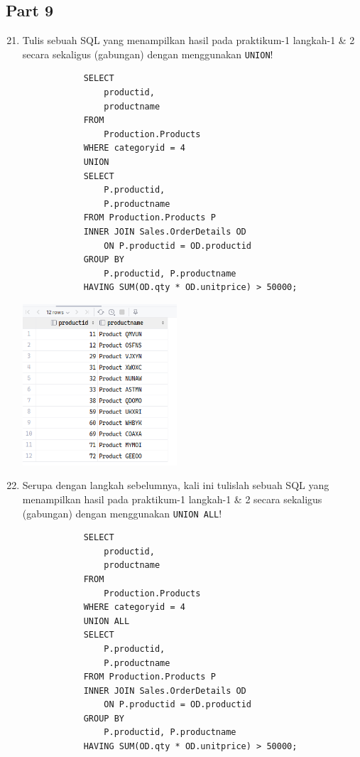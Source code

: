 \documentclass[12pt,titlepage]{article}
\begin{document}
\subsection{Part 9}
\begin{enumerate}
    \setcounter{enumi}{20}
    \item {
        Tulis sebuah SQL yang menampilkan hasil pada praktikum-1 langkah-1 \& 2 secara
        sekaligus (gabungan) dengan menggunakan \texttt{UNION}!

        \begin{verbatim}
            SELECT
                productid,
                productname
            FROM
                Production.Products
            WHERE categoryid = 4
            UNION
            SELECT
                P.productid,
                P.productname
            FROM Production.Products P
            INNER JOIN Sales.OrderDetails OD
                ON P.productid = OD.productid
            GROUP BY
                P.productid, P.productname
            HAVING SUM(OD.qty * OD.unitprice) > 50000;
        \end{verbatim}

        \begin{center}
            \includegraphics[height=6cm]{./images/p9-n1.png}
        \end{center}
    }
    \item {
        Serupa dengan langkah sebelumnya, kali ini tulislah sebuah SQL yang \\ menampilkan
        hasil pada praktikum-1 langkah-1 \& 2 secara sekaligus (gabungan) dengan menggunakan
        \texttt{UNION ALL}!

        \begin{verbatim}
            SELECT
                productid,
                productname
            FROM
                Production.Products
            WHERE categoryid = 4
            UNION ALL
            SELECT
                P.productid,
                P.productname
            FROM Production.Products P
            INNER JOIN Sales.OrderDetails OD
                ON P.productid = OD.productid
            GROUP BY
                P.productid, P.productname
            HAVING SUM(OD.qty * OD.unitprice) > 50000;
        \end{verbatim}

}
\end{enumerate}
\end{document}

